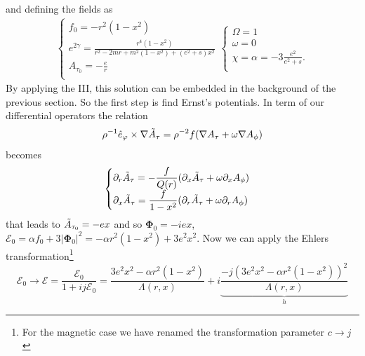 and defining the fields as 
\begin{equation*}
    \begin{aligned}
        \begin{cases}
            f_0 = -r^2(1-x^2) \\
           \displaystyle e^{2\gamma}  = \frac{r^4(1-x^2)}{r^2-2mr+m^2(1-x^2) + (e^2+s)x^2} \\
           \displaystyle A_{\tau_0} = -\frac{e}{r} \\
        \end{cases}
        \begin{cases}
            \Omega=1 \\
            \omega =0\\
            \displaystyle \chi = \alpha = -3\frac{e^2}{e^2+s}.\\
        \end{cases}
    \end{aligned}
\end{equation*}
By applying the III, this solution can be embedded in the background of the previous section. So the first step is find Ernst's potentials. In term of our differential operators the relation
\begin{equation}
    \rho^{-1}\hat{e}_{\varphi} \times \nabla \Tilde{A}_{\tau} = \rho^{-2}f(\nabla A_{\tau} + \omega \nabla A_{\phi})
    \label{definiione A tau tilde}
\end{equation}
becomes
\begin{equation*}
    \begin{aligned}
        \begin{cases}
           \displaystyle\partial_r\Tilde{A}_{\tau} = -\frac{f}{Q(r)}(\partial_x\Tilde{A}_{\tau}+\omega\partial_xA_{\phi}) \\
           \displaystyle\partial_x\Tilde{A}_{\tau} = \frac{f}{1-x^2}(\partial_r\Tilde{A}_{\tau}+\omega\partial_rA_{\phi}) \\
        \end{cases}
    \end{aligned}
\end{equation*}
that leads to $\Tilde{A}_{\tau_0} = -ex$ and so $\boldsymbol{\Phi}_0 = -iex$,  $\mathcal{E}_0 =\alpha f_0 + 3 |\boldsymbol{\Phi}_0|^2 =-\alpha r^2(1-x^2)+3e^2x^2$. Now we can apply the Ehlers transformation\footnote{For the magnetic case we have renamed the transformation parameter $c\rightarrow j$}
\begin{equation}
    \mathcal{E}_0 \longrightarrow \mathcal{E} = \frac{\mathcal{E}_0}{1+ij\mathcal{E}_0} = \frac{3e^2x^2-\alpha r^2(1-x^2)}{\Lambda(r,x)} + i \underbrace{\frac{-j(3e^2x^2-\alpha r^2(1-x^2))^2}{\Lambda(r,x)}}_{\displaystyle h}
\end{equation}
